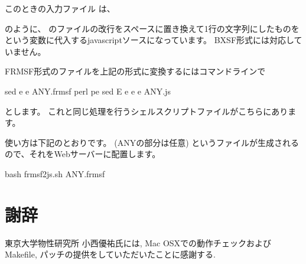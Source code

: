 \documentclass[letterpaper,10pt,dvipdfmx,openany]{sphinxmanual}
\begin{document}
\sphinxAtStartPar
このときの入力ファイル  は、

\begin{sphinxVerbatim}[commandchars=\\\{\}]
\end{sphinxVerbatim}

\sphinxAtStartPar
のように、 {\hyperref[\detokenize{input:input}]{}} のファイルの改行をスペースに置き換えて1行の文字列にしたものを
 という変数に代入するjavascriptソースになっています。
BXSF形式には対応していません。

\sphinxAtStartPar
FRMSF形式のファイルを上記の形式に変換するにはコマンドラインで

\begin{sphinxVerbatim}[commandchars=\\\{\}]
sed \PYGZhy{}e  \PYGZhy{}e  ANY.frmsf  perl \PYGZhy{}pe   sed \PYGZhy{}E \PYGZhy{}e  \PYGZhy{}e  \PYGZhy{}e  \PYGZgt{} ANY.js
\end{sphinxVerbatim}

\sphinxAtStartPar
とします。
これと同じ処理を行うシェルスクリプトファイルがこちらにあります。

\sphinxAtStartPar
{}

\sphinxAtStartPar
使い方は下記のとおりです。  (ANYの部分は任意) というファイルが生成されるので、それをWebサーバーに配置します。

\begin{sphinxVerbatim}[commandchars=\\\{\}]
\PYGZdl{} bash frmsf2js.sh ANY.frmsf
\end{sphinxVerbatim}


\chapter{謝辞}
\label{\detokenize{ack:id1}}\label{\detokenize{ack::doc}}
\sphinxAtStartPar
東京大学物性研究所 小西優祐氏には, Mac
OSXでの動作チェックおよびMakefile,
パッチの提供をしていただいたことに感謝する.
\end{document}
